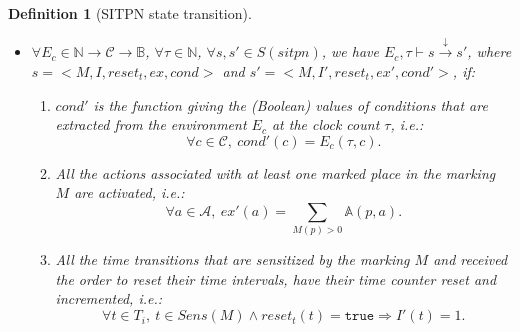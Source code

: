 \documentclass[pdflatex,sn-mathphys]{sn-jnl}%
\theoremstyle{thmstyleone}%
\theoremstyle{thmstyletwo}%
\theoremstyle{thmstylethree}%
\newtheorem{definition}{Definition}%
\begin{document}
\begin{definition}[SITPN state transition]
\begin{itemize}
\begin{enumerate}
    \item\label{it:exec-fun} All functions associated with at least one fired transition are executed, i.e:
      \begin{equation*}
        \forall{}f\in{}\mathcal{F},~ex'(f)=\sum\limits_{t\in{}Fired(s)}\mathbb{F}(t,f).
      \end{equation*}
    \end{enumerate}
    
  \item
    $\forall{}E_c\in\mathbb{N}\rightarrow\mathcal{C}\rightarrow\mathbb{B}$,
    $\forall\tau\in\mathbb{N}$, $\forall{}s,s'\in{}S(sitpn)$, we have
    $E_c,\tau\vdash{}s\xrightarrow{\downarrow}s'$, where
    $s=<M,I,reset_t,ex,cond>$ and $s'=<M,I',reset_t,ex',cond'>$, if:
    \begin{enumerate}[resume]
    \item\label{it:cond-env} $cond'$ is the function giving the
      (Boolean) values of conditions that are extracted from the
      environment $E_c$ at the clock count
      $\tau$, i.e.:
      \begin{equation*}
        \forall{}c\in{}\mathcal{C},~cond'(c)=E_c(\tau,c).
      \end{equation*}
      
    \item\label{it:activate-actions} All the actions associated
      with at least one
      marked place in the marking $M$ are activated, i.e.:
      \begin{equation*}
        \forall{}a\in{}\mathcal{A},~ex'(a)=\sum\limits_{M(p)>0}\mathbb{A}(p,a).
      \end{equation*}
    \item\label{it:reset-counters} All the time transitions that are
      sensitized by the marking $M$ and received the order to reset
      their time intervals, have their time counter reset and
      incremented, i.e.:
      \begin{equation*}
        \forall{}t\in{}T_i,~t\in{}Sens(M)\land{}reset_t(t)=\mathtt{true}
        \Rightarrow{}I'(t)=1.
      \end{equation*}
      

\end{enumerate}
\end{itemize}
\end{definition}
\end{document}
